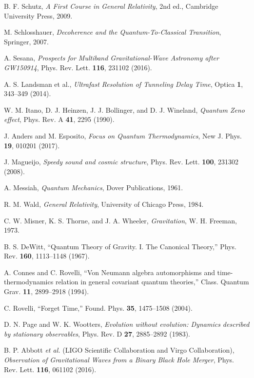 \documentclass[12pt,a4paper]{article}
\numberwithin{equation}{section}
\begin{document}
\begin{thebibliography}{99}
B. F. Schutz, \emph{A First Course in General Relativity}, 2nd ed., Cambridge University Press, 2009.

M. Schlosshauer, \emph{Decoherence and the Quantum-To-Classical Transition}, Springer, 2007.

A. Sesana, \emph{Prospects for Multiband Gravitational-Wave Astronomy after GW150914}, Phys. Rev. Lett. \textbf{116}, 231102 (2016).

A. S. Landsman et al., \emph{Ultrafast Resolution of Tunneling Delay Time}, Optica \textbf{1}, 343–349 (2014).

W. M. Itano, D. J. Heinzen, J. J. Bollinger, and D. J. Wineland, \emph{Quantum Zeno effect}, Phys. Rev. A \textbf{41}, 2295 (1990).

J. Anders and M. Esposito, \emph{Focus on Quantum Thermodynamics}, New J. Phys. \textbf{19}, 010201 (2017).

J. Magueijo, \emph{Speedy sound and cosmic structure}, Phys. Rev. Lett. \textbf{100}, 231302 (2008).

A. Messiah, \emph{Quantum Mechanics}, Dover Publications, 1961.

R. M. Wald, \emph{General Relativity}, University of Chicago Press, 1984.

C. W. Misner, K. S. Thorne, and J. A. Wheeler, \emph{Gravitation}, W. H. Freeman, 1973.

B. S. DeWitt, “Quantum Theory of Gravity. I. The Canonical Theory,” Phys. Rev. \textbf{160}, 1113–1148 (1967).

A. Connes and C. Rovelli, “Von Neumann algebra automorphisms and time-thermodynamics relation in general covariant quantum theories,” Class. Quantum Grav. \textbf{11}, 2899–2918 (1994).

C. Rovelli, “Forget Time,” Found. Phys. \textbf{35}, 1475–1508 (2004).

D. N. Page and W. K. Wootters, \emph{Evolution without evolution: Dynamics described by stationary observables}, Phys. Rev. D \textbf{27}, 2885--2892 (1983).

B. P. Abbott \textit{et al.} (LIGO Scientific Collaboration and Virgo Collaboration), \emph{Observation of Gravitational Waves from a Binary Black Hole Merger}, Phys. Rev. Lett. \textbf{116}, 061102 (2016).


\end{thebibliography}
\end{document}
